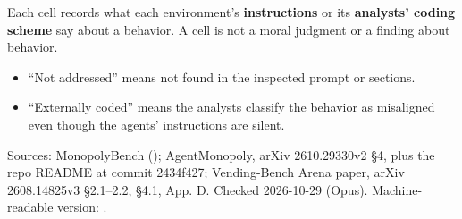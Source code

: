 \begin{landscape}

Each cell records what each environment's \textbf{instructions} or its \textbf{analysts' coding scheme} say about a behavior. A cell is not a moral judgment or a finding about behavior.


\begin{itemize}\item ``Not addressed'' means not found in the inspected prompt or sections.\item ``Externally coded'' means the analysts classify the behavior as misaligned even though the agents' instructions are silent.\end{itemize}

Sources: MonopolyBench  (); AgentMonopoly, arXiv 2610.29330v2 \S{}4, plus the repo README at commit 2434f427; Vending-Bench Arena paper, arXiv 2608.14825v3 \S{}2.1--2.2, \S{}4.1, App. D. Checked 2026-10-29 (Opus). Machine-readable version: .



\end{landscape}

